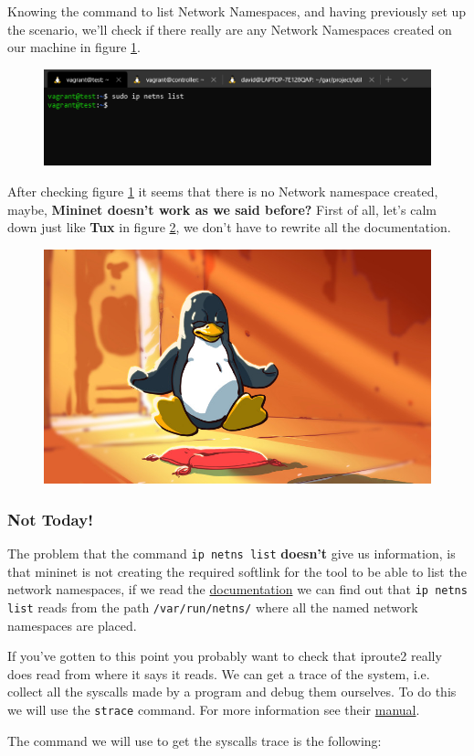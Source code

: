 \documentclass[12pt]{article}
\newcommand{\newpar} {
    \vskip 1cm
}
\begin{document}
		Knowing the command to list Network Namespaces, and having previously set up the scenario, we'll check if there really are any Network Namespaces created on our machine in figure \ref{f:netns_list}.

		\begin{figure}[!htb]
			\centering
			\includegraphics[width=\linewidth]{netns_list.png}
			\label{f:netns_list}
		\end{figure}

		After checking figure \ref{f:netns_list} it seems that there is no Network namespace created, maybe, \textbf{Mininet doesn't work as we said before?} First of all, let's calm down just like \textbf{Tux} in figure \ref{f:tux}, we don't have to rewrite all the documentation.

		\begin{figure}[!htb]
			\centering
			\includegraphics[width=0.6\linewidth]{calm_tux.jpg}
			\label{f:tux}
		\end{figure}

		\subsubsection{Not Today!}
			The problem that the command \texttt{ip netns list} \textbf{doesn't} give us information, is that mininet is not creating the required softlink for the tool to be able to list the network namespaces, if we read the \href{http://man7.org/linux/man-pages/man8/ip-netns.8.html}{documentation} we can find out that \texttt{ip netns list} reads from the path \texttt{/var/run/netns/} where all the named network namespaces are placed. 
			\newpar
			If you've gotten to this point you probably want to check that iproute2 really does read from where it says it reads. We can get a trace of the system, i.e. collect all the syscalls made by a program and debug them ourselves. To do this we will use the \texttt{strace} command. For more information see their \href{https://linux.die.net/man/1/strace}{manual}.
			\newpar
			The command we will use to get the syscalls trace is the following:
\end{document}
